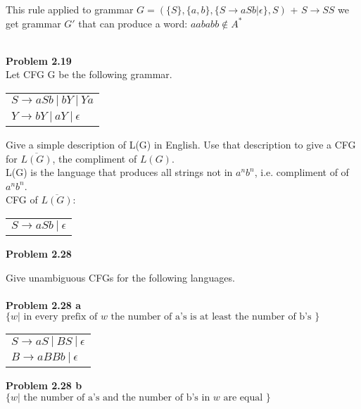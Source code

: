 \documentclass{article}
\newcommand\curl[1]{\{#1\}}
\newcommand{\problem}[1]{\large{\textbf{Problem #1} \\}}
\begin{document}
This rule applied to grammar $G = (\curl{S},\curl{a,b},\curl{S\rightarrow aSb | \epsilon},S)$ + $S\rightarrow SS$ we get grammar $G'$
that can produce a word:
$aababb \notin A^*$ \\ \\

\pagebreak

\problem{2.19}
Let  CFG G be the following grammar.
\begin{table}[h!]
\centering
\begin{tabular}{l}
$S \rightarrow a S b\: | \:b Y \:|\: Y a $\\
$Y \rightarrow b Y \:| \:a Y \:| \:\epsilon$
\end{tabular}
\end{table}

Give a simple description of L(G) in English. Use that description to give a CFG for $\overline{L(G)}$, the compliment of $L(G)$. \\

L(G) is the language that produces all strings not in $a^nb^n$, i.e. compliment of of $a^nb^n$. \\

CFG of $\overline{L(G)}$:

\begin{table}[h!]
\centering
\begin{tabular}{l}
$S \rightarrow a S b\: | \: \epsilon$
\end{tabular}
\end{table}

\problem{2.28}

Give unambiguous CFGs for the following languages.\\ \\
\problem{2.28 a}
$\{w| \text{ in every prefix of } w \text{ the number of a's is at least the number of b's }\}$

\begin{table}[h!]
\centering
\begin{tabular}{l}
$S \rightarrow a S\: | \:B S \:|\: \epsilon $\\
$B \rightarrow a BB b \: | \: \epsilon$\\
\end{tabular}
\end{table}

\problem{2.28 b}
$\{w| \text{ the number of a's and the number of b's in } w \text{ are equal }\}$ \\ \\
\end{document}
